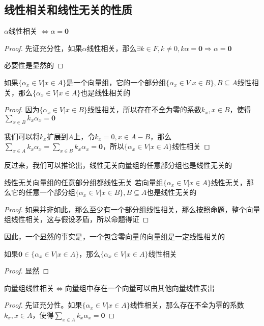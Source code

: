 \documentclass[12pt, a4paper, oneside, UTF8]{ctexbook}
\begin{document}
		\subsection{线性相关和线性无关的性质}
		\begin{para}{0}
				\begin{proposition}
					$\alpha $线性相关 $\Leftrightarrow \alpha =\mathbf{0}$
				\end{proposition}
				\begin{proof}
					先证充分性，如果$\alpha $线性相关，那么$\exists k \in F,k \neq 0,k\alpha =\mathbf{0} \Rightarrow \alpha =\mathbf{0}$

					必要性是显然的
				\end{proof}
				\begin{proposition}
					如果$\{\alpha_x \in V|x \in A\}$是一个向量组，它的一个部分组$\{\alpha_x \in V| x \in B\},B \subseteq A$线性相关，那么$\{\alpha_x \in V|x \in A\}$也是线性相关的
				\end{proposition}
				\begin{proof}
					因为$\{\alpha_x \in V| x \in B\}$线性相关，所以存在不全为零的系数$k_x,x \in B$，使得$\sum\limits_{x \in B} k_x \alpha_x = \mathbf{0}$

					我们可以将$k_x$扩展到$A$上，令$k_x = 0,x \in A-B$，那么$\sum\limits_{x \in A} k_x \alpha_x = \sum\limits_{x \in B} k_x \alpha_x=\mathbf{0}$，所以$\{\alpha_x \in V|x \in A\}$线性相关
				\end{proof}
				反过来，我们可以推论出，线性无关向量组的任意部分组也是线性无关的
				\begin{corollary}{线性无关向量组的任意部分组都线性无关}{}
					若向量组$\{\alpha_x \in V|x \in A\}$线性无关，那么它的任意一个部分组$\{\alpha_x \in V| x \in B\},B \subseteq A$也是线性无关的
				\end{corollary}
				\begin{proof}
					如果并非如此，那么至少有一个部分组线性相关，那么按照命题，整个向量组线性相关，这与假设矛盾，所以命题得证
				\end{proof}
				因此，一个显然的事实是，一个包含零向量的向量组是一定线性相关的
				\begin{proposition}
					如果$ \mathbf{0} \in \{\alpha_x \in V|x \in A\}$，那么$\{\alpha_x \in V|x \in A\}$线性相关
				\end{proposition}
				\begin{proof}
					显然
				\end{proof}
				\begin{proposition}
					向量组线性相关$\Leftrightarrow$向量组中存在一个向量可以由其他向量线性表出
				\end{proposition}
				\begin{proof}
					先证充分性。如果$\{\alpha_x \in V|x \in A\}$线性相关，那么存在不全为零的系数$k_x,x \in A$，使得$\sum\limits_{x \in A} k_x \alpha_x = \mathbf{0}$


\end{proof}
\end{para}
\end{document}
